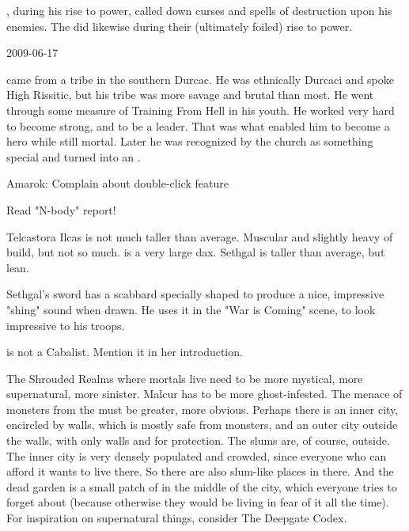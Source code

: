 \Secherdamon, during his rise to power, called down curses and spells of destruction upon his enemies.
The \malachim did likewise during their (ultimately foiled) rise to power. 



2009-06-17

\Narkiza came from a tribe in the southern Durcac.
He was ethnically Durcaci and spoke High Rissitic, but his tribe was more savage and brutal than most. 
He went through some measure of Training From Hell in his youth.
He worked very hard to become strong, and to be a leader.
That was what enabled him to become a hero while still mortal.
Later he was recognized by the church as something special and turned into an \Ashenoch.

Amarok: Complain about double-click feature

Read "N-body" report!

Telcastora Ilcas is not much taller than average.
Muscular and slightly heavy of build, but not so much.
\Narkiza is a very large dax.
Sethgal is taller than average, but lean. 

Sethgal's sword has a scabbard specially shaped to produce a nice, impressive "shing" sound when drawn.
He uses it in the "War is Coming" scene, to look impressive to his troops. 

\Urizeth is not a Cabalist.
Mention it in her introduction.

The Shrouded Realms where mortals live need to be more mystical, more supernatural, more sinister.
Malcur has to be more ghost-infested.
The menace of monsters from the \wylde must be greater, more obvious.
Perhaps there is an inner city, encircled by walls, which is mostly safe from monsters, and an outer city outside the walls, with only walls and \eidola for protection.
The slums are, of course, outside.
The inner city is very densely populated and crowded, since everyone who can afford it wants to live there.
So there are also slum-like places in there. 
And the dead garden is a small patch of \wylde in the middle of the city, which everyone tries to forget about (because otherwise they would be living in fear of it all the time).
For inspiration on supernatural things, consider The Deepgate Codex.

